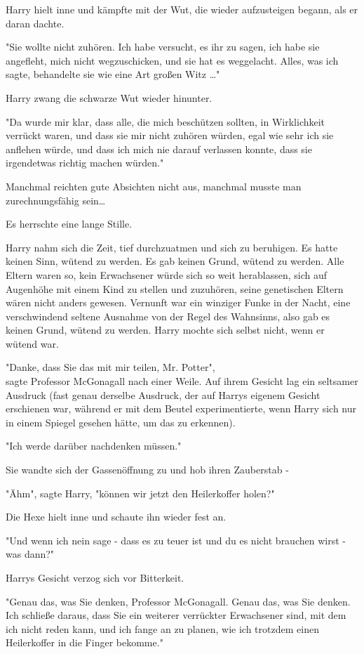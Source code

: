 {Harry hielt inne und kämpfte mit der Wut, die wieder aufzusteigen begann, als er daran dachte.

"Sie wollte nicht zuhören. Ich habe versucht, es ihr zu sagen, ich habe sie angefleht, mich nicht wegzuschicken, und sie hat es weggelacht. Alles, was ich sagte, behandelte sie wie eine Art großen Witz …"

Harry zwang die schwarze Wut wieder hinunter.

"Da wurde mir klar, dass alle, die mich beschützen sollten, in Wirklichkeit verrückt waren, und dass sie mir nicht zuhören würden, egal wie sehr ich sie anflehen würde, und dass ich mich nie darauf verlassen konnte, dass sie irgendetwas richtig machen würden."

Manchmal reichten gute Absichten nicht aus, manchmal musste man zurechnungsfähig sein…

Es herrschte eine lange Stille.

Harry nahm sich die Zeit, tief durchzuatmen und sich zu beruhigen. Es hatte keinen Sinn, wütend zu werden. Es gab keinen Grund, wütend zu werden. Alle Eltern waren so, kein Erwachsener würde sich so weit herablassen, sich auf Augenhöhe mit einem Kind zu stellen und zuzuhören, seine genetischen Eltern wären nicht anders gewesen. Vernunft war ein winziger Funke in der Nacht, eine verschwindend seltene Ausnahme von der Regel des Wahnsinns, also gab es keinen Grund, wütend zu werden. Harry mochte sich selbst nicht, wenn er wütend war.

"Danke, dass Sie das mit mir teilen, Mr. Potter",\\ sagte Professor McGonagall nach einer Weile. Auf ihrem Gesicht lag ein seltsamer Ausdruck (fast genau derselbe Ausdruck, der auf Harrys eigenem Gesicht erschienen war, während er mit dem Beutel experimentierte, wenn Harry sich nur in einem Spiegel gesehen hätte, um das zu erkennen).

"Ich werde darüber nachdenken müssen."

Sie wandte sich der Gassenöffnung zu und hob ihren Zauberstab -

"Ähm", sagte Harry, "können wir jetzt den Heilerkoffer holen?"

Die Hexe hielt inne und schaute ihn wieder fest an.

"Und wenn ich nein sage - dass es zu teuer ist und du es nicht brauchen wirst - was dann?"

Harrys Gesicht verzog sich vor Bitterkeit.

"Genau das, was Sie denken, Professor McGonagall. Genau das, was Sie denken. Ich schließe daraus, dass Sie ein weiterer verrückter Erwachsener sind, mit dem ich nicht reden kann, und ich fange an zu planen, wie ich trotzdem einen Heilerkoffer in die Finger bekomme."

}
